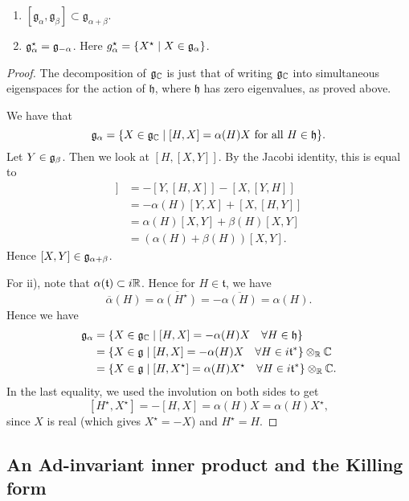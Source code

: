 \documentclass[11pt, english]{article}
\begin{document}
\begin{lemma}
\label{lemmadecomp}
  \begin{enumerate}
We have a decomposition $$\g_\C = \mathfrak h \oplus \bigoplus_{\alpha \in \Delta} \g_\alpha.$$ Also:
  \item $[\mathfrak g_\alpha, \mathfrak g_\beta] \subset \mathfrak g_{\alpha+\beta}$.
\item $\mathfrak g_\alpha^\star = \mathfrak g_{-\alpha}$. Here $g_\alpha^\star = \{ X^\star \mid X \in \mathfrak g_\alpha \}$.
  \end{enumerate}
\end{lemma}
\begin{proof}
The decomposition of $\mathfrak g_{\mathbb{C}}$ is just that of writing $\mathfrak g_{\mathbb{C}}$ into simultaneous eigenspaces for the action of $\mathfrak h$, where $\mathfrak h$ has zero eigenvalues, as proved above.

We have that 
$$
\mathfrak g_\alpha = \{ X \in \mathfrak g_{\mathbb{C}} \mid [H,X] = \alpha(H) X \text{ for all } H \in \mathfrak h\}.
$$
Let $Y \in \mathfrak g_\beta$. Then we look at $[H,[X,Y]]$. By the Jacobi identity, this is equal to
\begin{align*}
  [H,[X,Y]] &= -[Y,[H,X]] - [X,[Y,H]] \\
&= -\alpha(H)[Y,X] +[X,[H,Y]] \\
&= \alpha(H)[X,Y] +\beta(H)[X,Y] \\
&= (\alpha(H)+\beta(H))[X,Y].
\end{align*}
Hence $[X,Y] \in \mathfrak g_{\alpha+\beta}$.

For ii), note that $\alpha(\mathfrak t) \subset i \mathbb{R}$. Hence for $H \in \mathfrak t$, we have 
$$
\overline \alpha(H) = \overline{\alpha(H^\star)} = - \overline{\alpha(H)} = \alpha(H).
$$
Hence we have
\begin{align*}
\mathfrak g_\alpha &= \{ X \in \mathfrak g_{\mathbb{C}} \mid [H,X] = -\alpha(H)X \quad \forall H \in \mathfrak h \} \\
&= \{ X \in \mathfrak g \mid [H,X] = -\alpha(H) X \quad \forall H \in i \mathfrak t^\ast \} \otimes_{\mathbb{R}} \mathbb{C}  \\
&= \{ X \in \mathfrak g \mid [H,X^\star] = \alpha(H) X^\star \quad \forall H \in i \mathfrak t ^\ast \} \otimes_{\mathbb{R}} \mathbb{C}.
\end{align*}
In the last equality, we used the involution on both sides to get
$$
[H^\star, X^\star] = -[H,X] = \alpha(H) X = \alpha(H) X^\star,
$$
since $X$ is real (which gives $X^\star = -X$) and $H^\star=H$.
\end{proof}

\subsection{An Ad-invariant inner product and the Killing form}
\end{document}
